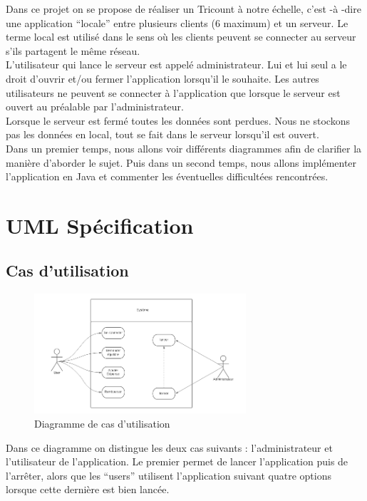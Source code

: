 \documentclass[12,french]{report}
\begin{document}
Dans ce projet on se propose de réaliser un Tricount à notre échelle, c'est -à -dire une application “locale” entre plusieurs clients (6 maximum) et un serveur. Le terme local est utilisé dans le sens où les clients peuvent se connecter au serveur s'ils partagent le même réseau.\\

L’utilisateur qui lance le serveur est appelé administrateur. Lui et lui seul a le droit d’ouvrir et/ou fermer l’application lorsqu’il le souhaite. Les autres utilisateurs ne peuvent se connecter à l’application que lorsque le serveur est ouvert au préalable par l’administrateur. \\

Lorsque le serveur est fermé toutes les données sont perdues. Nous ne stockons pas les données en local, tout se fait dans le serveur lorsqu’il est ouvert.\\

Dans un premier temps, nous allons voir différents diagrammes afin de clarifier la manière d’aborder le sujet. Puis dans un second temps, nous allons implémenter l’application en Java et commenter les éventuelles difficultées rencontrées.\\


\chapter{UML Spécification}

\section{Cas d'utilisation}

\begin{figure}[H]
	\center
	\includegraphics[width=0.7\textwidth]{./Images/Use-Case}
	\caption{Diagramme de cas d'utilisation}
\end{figure}\vspace{0.2cm}

Dans ce diagramme on distingue les deux cas suivants : l’administrateur et l’utilisateur de l’application. Le premier permet de lancer l’application puis de l'arrêter, alors que les “users” utilisent l’application suivant quatre options lorsque cette dernière est bien lancée.
\end{document}
